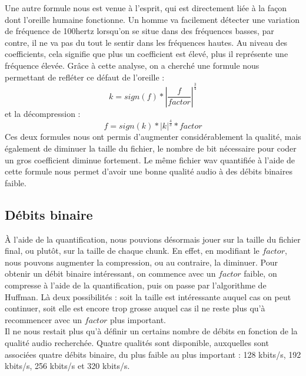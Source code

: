 \documentclass[a4paper,12pt]{report}
\begin{document}
Une autre formule nous est venue à l'esprit, qui est directement liée à la façon
dont l'oreille humaine fonctionne. Un homme va facilement détecter une variation
de fréquence de 100hertz lorsqu'on se situe dans des fréquences basses, par
contre, il ne va pas du tout le sentir dans les fréquences hautes. Au niveau des
coefficients, cela signifie que plus un coefficient est élevé, plus il
représente une fréquence élevée. Grâce à cette analyse, on a cherché une formule
nous permettant de refléter ce défaut de l'oreille :
$$ k = sign\left(f\right) * \left|\frac{f}{factor}\right|^{\frac{3}{4}}$$
et la décompression :
$$ f = sign\left(k\right) * \left|k\right|^{\frac{4}{3}} * factor$$
Ces deux formules nous ont permis d'augmenter considérablement la qualité, mais
également de diminuer la taille du fichier, le nombre de bit nécessaire pour
coder un gros coefficient diminue fortement. Le même fichier wav quantifiée à
l'aide de cette formule nous permet d'avoir une bonne qualité audio à des débits
binaires faible.
\subsection{Débits binaire}
À l'aide de la quantification, nous pouvions désormais jouer sur la taille du
fichier final, ou plutôt, sur la taille de chaque chunk. En effet, en modifiant
le $factor$, nous pouvons augmenter la compression, ou au contraire, la
diminuer. Pour obtenir un débit binaire intéressant, on commence avec un
$factor$ faible, on compresse à l'aide de la quantification, puis on passe par
l'algorithme de Huffman. Là deux possibilités : soit la taille est intéressante
auquel cas on peut continuer, soit elle est encore trop grosse auquel cas il ne
reste plus qu'à recommencer avec un $factor$ plus important.\\
Il ne nous restait plus qu'à définir un certains nombre de débits en fonction de
la qualité audio recherchée. Quatre qualités sont disponible, auxquelles sont
associées quatre débits binaire, du plus faible au plus important : 128 kbits/s,
192 kbits/s, 256 kbits/s et 320 kbits/s.
\end{document}
